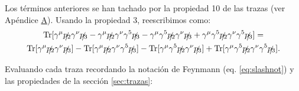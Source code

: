 Los términos anteriores se han tachado por la propiedad 10 de las trazas (ver Apéndice \hyperref[cap:A]{A}). Usando la propiedad 3, reescribimos como:
\begin{multline}
\operatorname{Tr}[ \gamma ^{\mu }\slashed{p_{2}}\gamma ^{\nu }\slashed{p_{3}} -\gamma ^{\mu }\slashed{p_{2}}\gamma ^{\nu }\gamma ^{5}\slashed{p_{3}} -\gamma ^{\mu }\gamma ^{5}\slashed{p_{2}}\gamma ^{\nu }\slashed{p_{3}} +\gamma ^{\mu }\gamma ^{5}\slashed{p_{2}}\gamma ^{\nu }\gamma ^{5}\slashed{p_{3}}] = \\ \operatorname{Tr}[ \gamma ^{\mu }\slashed{p_{2}}\gamma ^{\nu }\slashed{p_{3}}] - \operatorname{Tr}[\gamma ^{\mu }\slashed{p_{2}}\gamma ^{\nu }\gamma ^{5}\slashed{p_{3}}] - \operatorname{Tr}[\gamma ^{\mu }\gamma ^{5}\slashed{p_{2}}\gamma ^{\nu }\slashed{p_{3}}] + \operatorname{Tr}[\gamma ^{\mu }\gamma ^{5}\slashed{p_{2}}\gamma ^{\nu }\gamma ^{5}\slashed{p_{3}}] .
\end{multline}

Evaluando cada traza recordando la notación de Feynmann (eq. \ref{eq:slashnot}) y las propiedades de la sección \ref{sec:trazas}:

